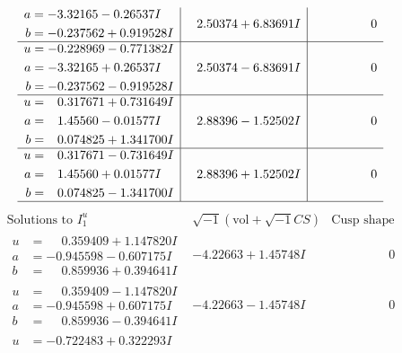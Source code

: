 \documentclass[1p]{elsarticle_modified}
\theoremstyle{definition}
\newcommand{\I}{\sqrt{-1}}
\begin{document}
$$\begin{array}{c|c|c}
\begin{aligned}
a &= -3.32165 - 0.26537 I \\
b &= -0.237562 + 0.919528 I\end{aligned}
 & \phantom{-}2.50374 + 6.83691 I & \phantom{-0.000000 } 0 \\ \hline\begin{aligned}
u &= -0.228969 - 0.771382 I \\
a &= -3.32165 + 0.26537 I \\
b &= -0.237562 - 0.919528 I\end{aligned}
 & \phantom{-}2.50374 - 6.83691 I & \phantom{-0.000000 } 0 \\ \hline\begin{aligned}
u &= \phantom{-}0.317671 + 0.731649 I \\
a &= \phantom{-}1.45560 - 0.01577 I \\
b &= \phantom{-}0.074825 + 1.341700 I\end{aligned}
 & \phantom{-}2.88396 - 1.52502 I & \phantom{-0.000000 } 0 \\ \hline\begin{aligned}
u &= \phantom{-}0.317671 - 0.731649 I \\
a &= \phantom{-}1.45560 + 0.01577 I \\
b &= \phantom{-}0.074825 - 1.341700 I\end{aligned}
 & \phantom{-}2.88396 + 1.52502 I & \phantom{-0.000000 } 0\\
 \hline 
 \end{array}$$\newpage$$\begin{array}{c|c|c}  
\text{Solutions to }I^u_{1}& \I (\text{vol} + \sqrt{-1}CS) & \text{Cusp shape}\\
 \hline 
\begin{aligned}
u &= \phantom{-}0.359409 + 1.147820 I \\
a &= -0.945598 - 0.607175 I \\
b &= \phantom{-}0.859936 + 0.394641 I\end{aligned}
 & -4.22663 + 1.45748 I & \phantom{-0.000000 } 0 \\ \hline\begin{aligned}
u &= \phantom{-}0.359409 - 1.147820 I \\
a &= -0.945598 + 0.607175 I \\
b &= \phantom{-}0.859936 - 0.394641 I\end{aligned}
 & -4.22663 - 1.45748 I & \phantom{-0.000000 } 0 \\ \hline\begin{aligned}
u &= -0.722483 + 0.322293 I \\

\end{aligned}
\end{array}$$
\end{document}
